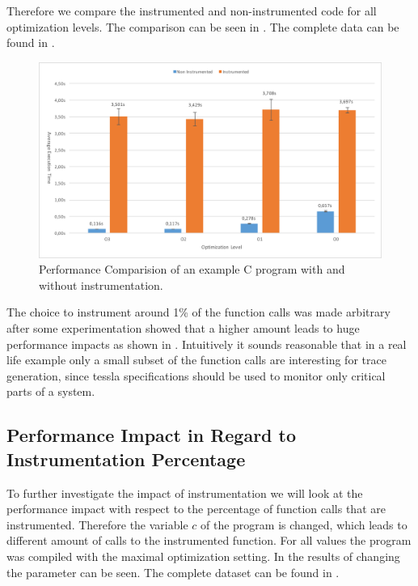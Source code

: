 Therefore we compare the instrumented and non-instrumented code for all optimization levels.
The comparison can be seen in .
The complete data can be found in .

\begin{figure}
  \includegraphics[width=\textwidth]{gfx/instrumentation_time_benchmark}
  \caption{Performance Comparision of an example C program with and without instrumentation.}
\label{fig:chap_eval:instrument_benchmark_results}
\end{figure}

The choice to instrument around 1\% of the function calls was made arbitrary after some experimentation showed that a higher amount leads to huge performance impacts as shown in .
Intuitively it sounds reasonable that in a real life example only a small subset of the function calls are interesting for trace generation, since \gls{tessla} specifications should be used to monitor only critical parts of a system.

\subsection{Performance Impact in Regard to Instrumentation Percentage}
\label{sec:evaluation:instrumentation_benchmark:instr_amount}

To further investigate the impact of instrumentation we will look at the performance impact with respect to the percentage of function calls that are instrumented.
Therefore the variable \(c\) of the program is changed, which leads to different amount of calls to the instrumented function.
For all values the program was compiled with the maximal optimization setting.
In  the results of changing the parameter can be seen.
The complete dataset can be found in .

